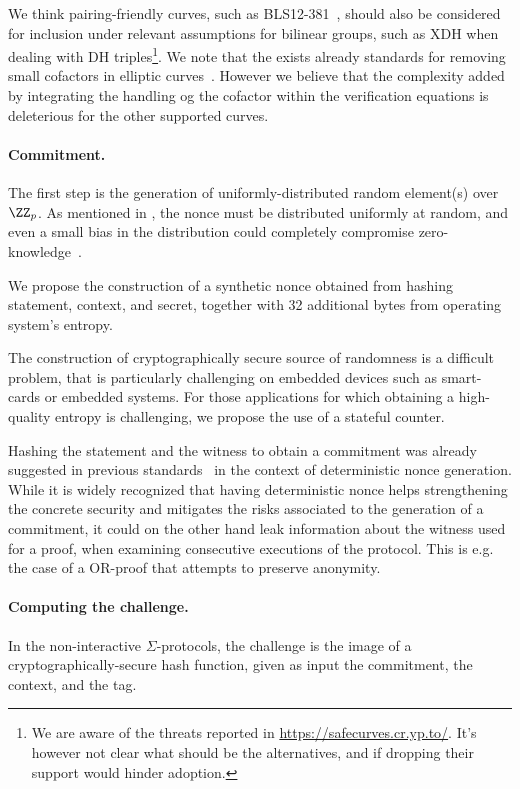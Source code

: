 \documentclass[runningheads]{llncs}
\begin{document}
We think pairing-friendly curves, such as BLS12-381~\cite{bls12}, should also be considered for inclusion under relevant assumptions for bilinear groups, such as XDH when dealing with DH triples\footnote{We are aware of the threats reported in
\url{https://safecurves.cr.yp.to/}.
It's however not clear what should be the alternatives, and if dropping their support would hinder adoption.
}.
We note that the exists already standards for removing small cofactors in elliptic curves~\cite{rfc2785}.
 However we believe that the complexity added by integrating the handling og the cofactor within the verification equations is deleterious for the other supported curves.

\paragraph{Commitment.} The first step is the generation of uniformly-distributed random element(s) over $\ZZ_p$. As mentioned in , the nonce must be distributed uniformly at random, and even a small bias in the distribution could completely compromise zero-knowledge~\cite{XX}.

We propose the construction of a synthetic nonce obtained from hashing statement, context, and secret, together with 32 additional bytes from operating system's entropy.

The construction of cryptographically secure source of randomness is a difficult problem, that is particularly challenging on embedded devices such as smart-cards or embedded systems. For those applications for which obtaining a high-quality entropy is challenging, we propose the use of a stateful counter.

Hashing the statement and the witness to obtain a commitment was already suggested in previous standards~\cite{rfc6979} in the context of deterministic nonce generation.
While it is widely recognized that having deterministic nonce helps strengthening the concrete security  and mitigates the risks associated to the generation of a commitment, it could on the other hand leak information about the witness used for a proof, when examining consecutive executions of the protocol. This is e.g. the case of a OR-proof that attempts to preserve anonymity.

\paragraph{Computing the challenge.} In the non-interactive $\Sigma$-protocols, the challenge is the image of a cryptographically-secure hash function,
given as input the commitment, the context, and the tag.
\end{document}
